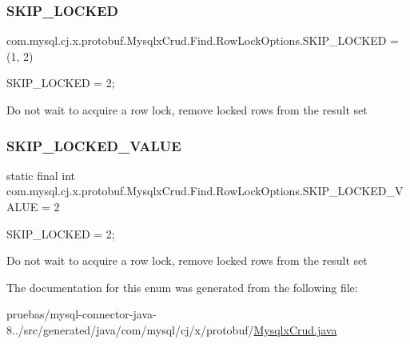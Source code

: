 \subsubsection{\texorpdfstring{S\+K\+I\+P\+\_\+\+L\+O\+C\+K\+ED}{SKIP\_LOCKED}}
{\footnotesize\ttfamily com.\+mysql.\+cj.\+x.\+protobuf.\+Mysqlx\+Crud.\+Find.\+Row\+Lock\+Options.\+S\+K\+I\+P\+\_\+\+L\+O\+C\+K\+ED =(1, 2)}

{\ttfamily S\+K\+I\+P\+\_\+\+L\+O\+C\+K\+ED = 2;}


\begin{DoxyPre}
Do not wait to acquire a row lock, remove locked rows from the result set
\end{DoxyPre}
 \mbox{\label{enumcom_1_1mysql_1_1cj_1_1x_1_1protobuf_1_1_mysqlx_crud_1_1_find_1_1_row_lock_options_acdab3701d93fa0c87ffa68bf407ecd12}} 
\subsubsection{\texorpdfstring{S\+K\+I\+P\+\_\+\+L\+O\+C\+K\+E\+D\+\_\+\+V\+A\+L\+UE}{SKIP\_LOCKED\_VALUE}}
{\footnotesize\ttfamily  static  final int com.\+mysql.\+cj.\+x.\+protobuf.\+Mysqlx\+Crud.\+Find.\+Row\+Lock\+Options.\+S\+K\+I\+P\+\_\+\+L\+O\+C\+K\+E\+D\+\_\+\+V\+A\+L\+UE = 2\hspace{0.3cm}{\ttfamily [static]}}

{\ttfamily S\+K\+I\+P\+\_\+\+L\+O\+C\+K\+ED = 2;}


\begin{DoxyPre}
Do not wait to acquire a row lock, remove locked rows from the result set
\end{DoxyPre}
 

The documentation for this enum was generated from the following file\+:\begin{DoxyCompactItemize}
\item 
pruebas/mysql-\/connector-\/java-\/8../src/generated/java/com/mysql/cj/x/protobuf/\mbox{\hyperlink{_mysqlx_crud_8java}{Mysqlx\+Crud.\+java}}\end{DoxyCompactItemize}

